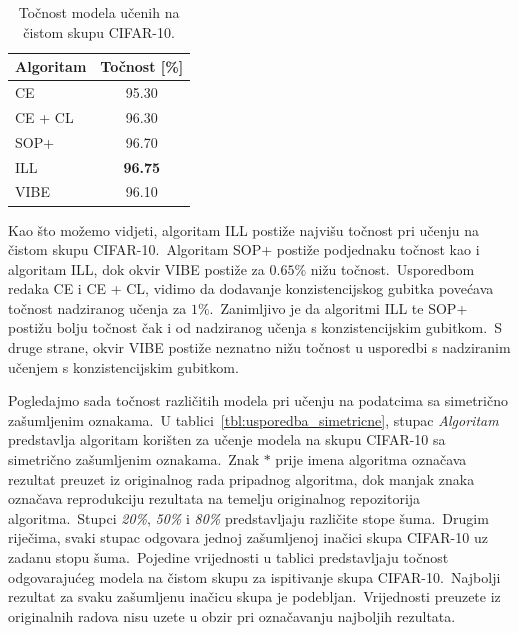 \documentclass[diplomskirad]{fer}
\begin{document}
\begin{table}[htb]
  \caption{Točnost modela učenih na čistom skupu CIFAR-10.}
  \label{tbl:usporedba_ciste}
  \centering
  \begin{tabular}{l||c}
  Algoritam & Točnost [\%] \\ \hline \hline
  CE & 95.30 \\
  CE + CL & 96.30 \\ \hline
  SOP+ & 96.70 \\
  ILL & \textbf{96.75} \\ \hline
  VIBE & 96.10 \\
  \end{tabular}
\end{table}

Kao što možemo vidjeti, algoritam ILL postiže najvišu točnost pri učenju na čistom skupu CIFAR-10.\ Algoritam SOP+ postiže podjednaku točnost kao i algoritam ILL, dok okvir VIBE postiže za $0.65\%$ nižu točnost.\ 
Usporedbom redaka CE i CE + CL, vidimo da dodavanje konzistencijskog gubitka povećava točnost nadziranog učenja za $1\%$.\ Zanimljivo je da algoritmi ILL te SOP+ postižu bolju točnost čak i od nadziranog učenja s konzistencijskim gubitkom.\ 
S druge strane, okvir VIBE postiže neznatno nižu točnost u usporedbi s nadziranim učenjem s konzistencijskim gubitkom.\ 

Pogledajmo sada točnost različitih modela pri učenju na podatcima sa simetrično zašumljenim oznakama.\ 
U tablici~\ref{tbl:usporedba_simetricne}, stupac \textit{Algoritam} predstavlja algoritam korišten za učenje modela na skupu CIFAR-10 sa simetrično zašumljenim oznakama.\ 
Znak $*$ prije imena algoritma označava rezultat preuzet iz originalnog rada pripadnog algoritma, dok manjak znaka označava reprodukciju rezultata na temelju originalnog repozitorija algoritma.\
Stupci \textit{20\%}, \textit{50\%} i \textit{80\%} predstavljaju različite stope šuma.\ Drugim riječima, svaki stupac odgovara jednoj zašumljenoj inačici skupa CIFAR-10 uz zadanu stopu šuma.\ 
Pojedine vrijednosti u tablici predstavljaju točnost odgovarajućeg modela na čistom skupu za ispitivanje skupa CIFAR-10.\ Najbolji rezultat za svaku zašumljenu inačicu skupa je podebljan.\
Vrijednosti preuzete iz originalnih radova nisu uzete u obzir pri označavanju najboljih rezultata.\ 
\end{document}
